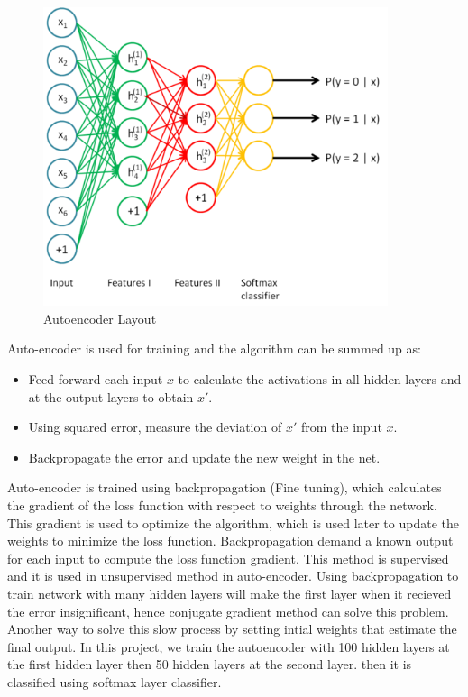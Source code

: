 \begin{figure}[htb]
        \centering
        \includegraphics[width = 0.9\textwidth, height = 0.5\textheight]{figures/Autoencoder.png} %
  \caption{Autoencoder Layout}
  \label{fig:Autoencoder Layout}
\end{figure} 

Auto-encoder is used for training and the algorithm can be summed up as:
\begin{itemize}
\item Feed-forward each input $x$ to calculate the activations in all hidden layers and at the output layers to obtain $x'$.
\item Using squared error, measure the deviation of $x'$ from the input $x$.
\item Backpropagate the error and update the new weight in the net.  
\end{itemize}

Auto-encoder is trained using backpropagation (Fine tuning), which calculates the gradient of the loss function with respect to weights through the network.
This gradient is used to optimize the algorithm, which is used later to update the weights to minimize the loss function\cite{liou2014autoencoder}.
Backpropagation demand a known output for each input to compute the loss function gradient. 
This method is supervised and it is used in unsupervised method in auto-encoder.
Using backpropagation to train network with many hidden layers will make the first layer when it recieved the error insignificant, hence conjugate gradient method can solve this problem.
Another way to solve this slow process by setting intial weights that estimate the final output.
In this project, we train the autoencoder with 100 hidden layers at the first hidden layer then 50 hidden layers at the second layer. then it is classified using softmax layer classifier.

